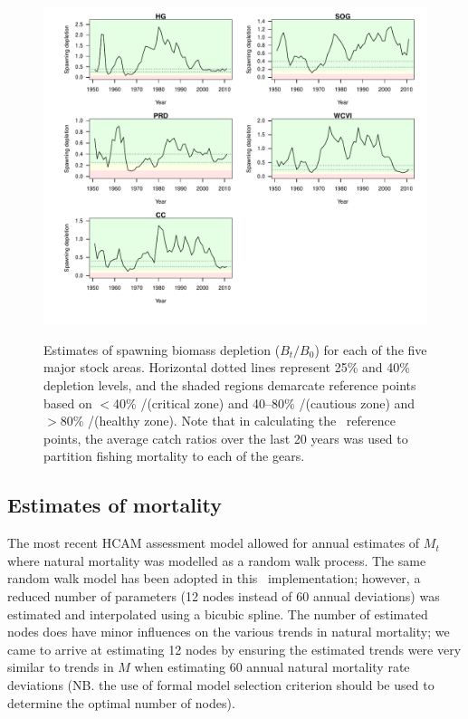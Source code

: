 \begin{figure}[!tbp]
	\includegraphics[width=\textwidth]{../FIGS/qPriorFigs/iscam_fig_depletion.pdf}\\
	\caption{Estimates of spawning biomass depletion ($B_t/B_0$) for each of the five major stock areas.  Horizontal dotted lines represent 25\% and 40\% depletion levels, and the shaded regions demarcate reference points based on $<$40\% \bmsy/\bo (critical zone) and 40--80\% \bmsy/\bo(cautious zone) and $>$80\% \bmsy/\bo (healthy zone). Note that in calculating the \bmsy\ reference points, the average catch ratios over the last 20 years was used to partition fishing mortality to each of the gears.}\label{PartII:Results:figDepletion}
\end{figure}




\subsection{Estimates of mortality}

The most recent HCAM assessment model allowed for annual estimates of $M_t$ where natural mortality was modelled as a random walk process.  The same random walk model has been adopted in this \iscam\ implementation; however, a reduced number of parameters (12 nodes instead of 60 annual deviations) was estimated and interpolated using a bicubic spline.  The number of estimated nodes does have minor influences on the various trends in natural mortality; we came to arrive at estimating 12 nodes by ensuring the estimated trends were very similar to trends in $M$ when estimating 60 annual natural mortality rate deviations (NB. the use of formal model selection criterion should be used to determine the optimal number of nodes).

